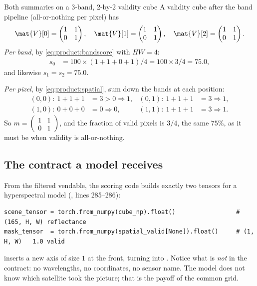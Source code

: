 \begin{worked}[label={we:product:validity}]{Both summaries on a 3-band, 2-by-2 validity cube}
A validity cube after the band pipeline (all-or-nothing per pixel) has
\[
\mat{V}[0] = \begin{pmatrix}1&1\\0&1\end{pmatrix},\quad
\mat{V}[1] = \begin{pmatrix}1&1\\0&1\end{pmatrix},\quad
\mat{V}[2] = \begin{pmatrix}1&1\\0&1\end{pmatrix}.
\]
\emph{Per band}, by \cref{eq:product:bandscore} with $HW = 4$:
\begin{align*}
s_0 &= 100 \times (1 + 1 + 0 + 1)/4 = 100 \times 3/4 = 75.0,
\end{align*}
and likewise $s_1 = s_2 = 75.0$.

\emph{Per pixel}, by \cref{eq:product:spatial}, sum down the bands at each position:
\begin{align*}
(0,0):\ 1 + 1 + 1 &= 3 > 0 \Rightarrow 1, & (0,1):\ 1 + 1 + 1 &= 3 \Rightarrow 1,\\
(1,0):\ 0 + 0 + 0 &= 0 \Rightarrow 0, & (1,1):\ 1 + 1 + 1 &= 3 \Rightarrow 1.
\end{align*}
So $m = \begin{pmatrix}1&1\\0&1\end{pmatrix}$, and the fraction of valid pixels is $3/4$, the
same $75\%$, as it must be when validity is all-or-nothing.
\end{worked}

\subsection{The contract a model receives}

From the filtered vendable, the scoring code builds exactly two tensors for a hyperspectral model
(, lines 285--286):
\begin{lstlisting}
scene_tensor = torch.from_numpy(cube_np).float()                 # (165, H, W) reflectance
mask_tensor  = torch.from_numpy(spatial_valid[None]).float()     # (1, H, W)   1.0 valid
\end{lstlisting}
\code{[None]} inserts a new axis of size $1$ at the front, turning  into
. Notice what is \emph{not} in the contract: no wavelengths, no coordinates, no
sensor name. The model does not know which satellite took the picture; that is the payoff of the
common grid.

